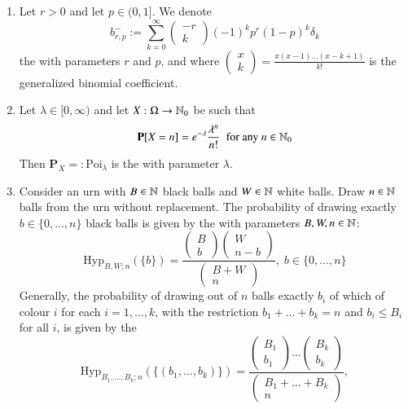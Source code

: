 \documentclass[12pt, a4paper, oneside, openright, titlepage]{book}
\begin{document}
\begin{eg}
\begin{enumerate}[label=\roman*]
        \item Let $r > 0$ and let $p \in (0,1]$. We denote \begin{equation*}
                b^-_{r,p} := \sum_{k=0}^{\infty}\begin{pmatrix} -r \\ k\end{pmatrix}(-1)^kp^r(1-p)^k\delta_k
        \end{equation*}
            the  with parameters $r$ and $p$, and where $\begin{pmatrix} x\\ k\end{pmatrix} = \frac{x(x-1)...(x-k+1)}{k!}$ is the generalized binomial coefficient.
            \item Let $\lambda \in [0,\infty)$ and let $X:\Omega\rightarrow \mathbb N_0$ be such that \begin{equation*}
                    \mathbf{P}[X = n] = e^{-\lambda}\frac{\lambda^n}{n!}\;\text{ for any } n \in \mathbb N_0
            \end{equation*}
            Then $\mathbf{P}_X =: \text{Poi}_{\lambda}$ is the  with parameter $\lambda$.
        \item Consider an urn with $B \in \mathbb N$ black balls and $W \in \mathbb N$ white balls. Draw $n \in \mathbb N$ balls from the urn without replacement. The probability of drawing exactly $b \in \{0,...,n\}$ black balls is given by the  with parameters $B,W,n \in \mathbb N$: \begin{equation*}
                \text{Hyp}_{B,W;n}(\{b\}) = \frac{\begin{pmatrix} B \\ b\end{pmatrix}\begin{pmatrix} W\\ n-b\end{pmatrix}}{\begin{pmatrix} B+W \\ n\end{pmatrix}},\;b\in\{0,...,n\}
        \end{equation*}
            Generally, the probability of drawing out of $n$ balls exactly $b_i$ of which of colour $i$ for each $i = 1,...,k$, with the restriction $b_1+...+b_k = n$ and $b_i \leq B_i$ for all $i$, is given by the  \begin{equation*}
                \text{Hyp}_{B_1,...,B_k;n}(\{(b_1,...,b_k)\}) = \frac{\begin{pmatrix} B_1 \\ b_1\end{pmatrix}...\begin{pmatrix} B_k\\ b_k\end{pmatrix}}{\begin{pmatrix} B_1+...+B_k \\ n\end{pmatrix}},

\end{equation*}
\end{enumerate}
\end{eg}
\end{document}
